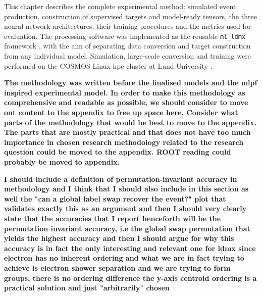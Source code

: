 This chapter describes the complete experimental method: simulated event
production, construction of supervised targets and model-ready tensors, the
three neural-network architectures, their training procedures and the metrics
used for evaluation. The processing software was implemented as the reusable
\texttt{ml\_ldmx} framework \cite{ml_ldmx-github}, with the aim of separating
data conversion and target construction from any individual model. Simulation,
large-scale conversion and training were performed on the COSMOS Linux
\gls{hpc} cluster at Lund University \cite{lunarc_cosmos}.













\textbf{The methodology was written before the finalised models and the mlpf inspired experimental model. 
In order to make this methodology as comprehensive and readable as possible, we should consider to move out content to the appendix to free up space here. Consider what parts of the methodology that would be best to move to the appendix. The parts that are mostly practical and that does not have too much importance in chosen research  methodology related to the research question could be moved to the appendix. 
ROOT reading could probably be moved to appendix.}

\textbf{I should include a definition of permutation-invariant accuracy in methodology and I think that I should also include in this section as well the "can a global label swap recover the event?" plot that validates exactly this as an argument and then I should very clearly state that the accuracies that I report henceforth will be the permutation invariant accuracy, i.e the global swap permutation that yields the highest accuracy and then I should argue for why this accuracy is in fact the only interesting and relevant one for ldmx since electron has no inherent ordering and what we are in fact trying to achieve is electron shower separation and we are trying to form groups, there is no ordering difference the y-axis centroid ordering is a practical solution and just "arbitrarily" chosen}



